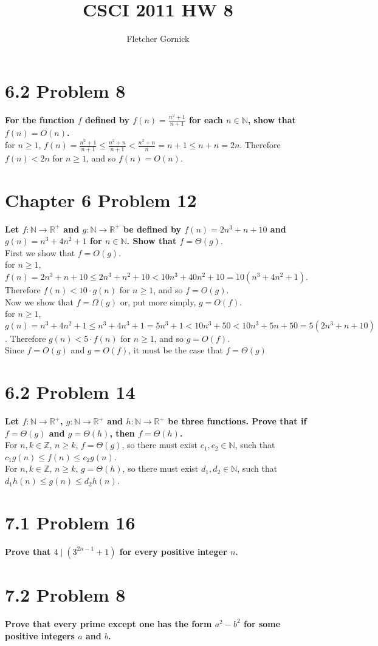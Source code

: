 \documentclass[10pt]{article}
\title{CSCI 2011 HW 8}
\author{Fletcher Gornick}
\begin{document}
\maketitle

\section{6.2 Problem 8}
\textbf{For the function $f$ defined by $f(n) = \frac{n^2+1}{n+1}$ for each $n \in \mathbb{N}$, show that $f(n) = O(n)$.} \\

for $n \geq 1$,
$f(n) = \frac{n^2+1}{n+1} \leq \frac{n^2+n}{n+1} < \frac{n^2+n}{n} = n + 1 \leq n + n = 2n$.  Therefore $f(n) < 2n$ for $n \geq 1$, and so $f(n) = O(n)$.


\section{Chapter 6 Problem 12}
\textbf{Let $f: \mathbb{N} \to \mathbb{R}^+$ and $g: \mathbb{N} \to \mathbb{R}^+$ be defined by $f(n) = 2n^3 + n + 10$ and $g(n) = n^3 + 4n^2 + 1$
for $n \in \mathbb{N}$.  Show that $f = \Theta(g)$}. \\

First we show that $f = O(g)$. \\
for $n \geq 1$, $f(n) = 2n^3 + n + 10 \leq 2n^3 + n^2 + 10 < 10n^3 + 40n^2 + 10 = 10(n^3 + 4n^2 + 1)$.  Therefore $f(n) < 10 \cdot g(n)$ for $n \geq 1$, and so
$f = O(g)$. \\

Now we show that $f = \Omega(g)$ or, put more simply, $g = O(f)$. \\
for $n \geq 1$, $g(n) = n^3 + 4n^2 + 1 \leq n^3 + 4n^3 + 1 = 5n^3 + 1 < 10n^3 + 50 < 10n^3 + 5n + 50 = 5(2n^3 + n + 10)$.  Therefore $g(n) < 5 \cdot f(n)$ for
$n \geq 1$, and so $g = O(f)$. \\

Since $f = O(g)$ and $g = O(f)$, it must be the case that $f = \Theta(g)$


\section{6.2 Problem 14}
\textbf{Let $f: \mathbb{N} \to \mathbb{R}^+$, $g: \mathbb{N} \to \mathbb{R}^+$ and $h: \mathbb{N} \to \mathbb{R}^+$ be three functions.  Prove that
if $f = \Theta(g)$ and $g = \Theta(h)$, then $f = \Theta(h)$.} \\

For $n,k \in \mathbb{Z}$, $n \geq k$, $f = \Theta(g)$, so there must exist $c_1, c_2 \in \mathbb{N}$, such that $c_1g(n) \leq f(n) \leq c_2g(n)$. \\
For $n,k \in \mathbb{Z}$, $n \geq k$, $g = \Theta(h)$, so there must exist $d_1, d_2 \in \mathbb{N}$, such that $d_1h(n) \leq g(n) \leq d_2h(n)$.


\section{7.1 Problem 16}
\textbf{Prove that $4 \mid (3^{2n-1} + 1)$ for every positive integer $n$.}


\section{7.2 Problem 8}
\textbf{Prove that every prime except one has the form $a^2 - b^2$ for some positive integers $a$ and $b$.}
\end{document}
